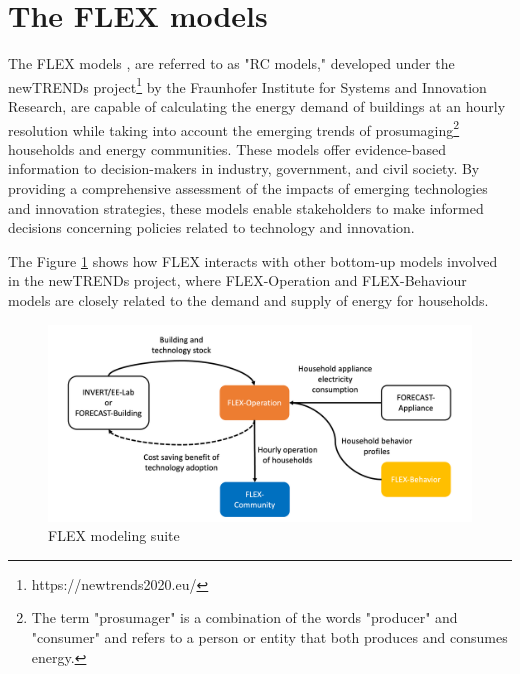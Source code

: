 \section{The FLEX models}

The FLEX models \cite{newtrends}, are referred to as "RC models," developed under the newTRENDs project\footnote{https://newtrends2020.eu/} by the Fraunhofer Institute for Systems and Innovation Research, 
are capable of calculating the energy demand of buildings at an hourly resolution while taking into account the emerging trends of prosumaging\footnote{The term "prosumager" is a combination of the words "producer" and "consumer" and refers to a person or entity that both produces and consumes energy.} households and energy communities. 
These models offer evidence-based information to decision-makers in industry, government, and civil society. 
By providing a comprehensive assessment of the impacts of emerging technologies and innovation strategies, these models enable stakeholders to make informed decisions concerning policies related to technology and innovation. 

The Figure \ref{fig:flex} shows how FLEX interacts with other bottom-up models involved in the newTRENDs project,
where FLEX-Operation and FLEX-Behaviour models are closely related to the demand and supply of energy for households. 
\begin{figure}[h]
  \centering
  \includegraphics[width=\textwidth]{Images/flex.png}
  \caption{FLEX modeling suite}
  \label{fig:flex}
\end{figure}



